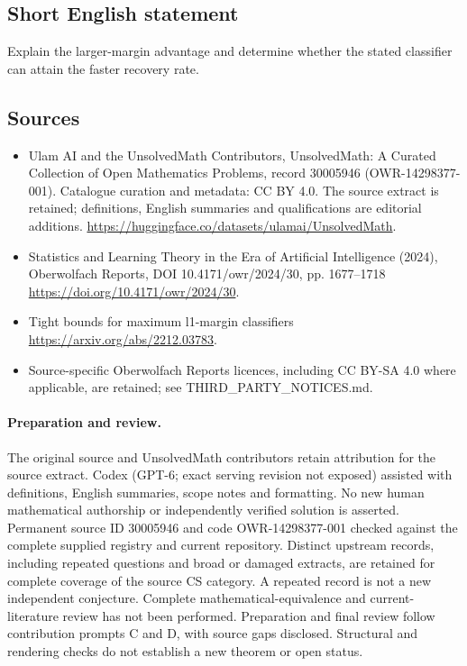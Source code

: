 \documentclass[11pt]{article}
\begin{document}
\subsection{Short English statement}
Explain the larger-margin advantage and determine whether the stated classifier can attain the faster recovery rate.
\subsection{Sources}
\begin{itemize}
\item[\hypertarget{source:30005946:1}{S1}] Ulam AI and the UnsolvedMath Contributors, UnsolvedMath: A Curated Collection of Open Mathematics Problems, record 30005946 (OWR-14298377-001). Catalogue curation and metadata: CC BY 4.0. The source extract is retained; definitions, English summaries and qualifications are editorial additions.
\url{https://huggingface.co/datasets/ulamai/UnsolvedMath}.
\item[\hypertarget{source:30005946:2}{S2}] Statistics and Learning Theory in the Era of Artificial Intelligence (2024), Oberwolfach Reports, DOI 10.4171/owr/2024/30, pp. 1677--1718
\url{https://doi.org/10.4171/owr/2024/30}.
\item[\hypertarget{source:30005946:3}{S3}] Tight bounds for maximum l1-margin classifiers
\url{https://arxiv.org/abs/2212.03783}.
\item Source-specific Oberwolfach Reports licences, including CC BY-SA 4.0 where applicable, are retained; see THIRD\_PARTY\_NOTICES.md.
\end{itemize}
\paragraph{Preparation and review.}
The original source and UnsolvedMath contributors retain attribution for the source extract. Codex (GPT-6; exact serving revision not exposed) assisted with definitions, English summaries, scope notes and formatting. No new human mathematical authorship or independently verified solution is asserted. Permanent source ID 30005946 and code OWR-14298377-001 checked against the complete supplied registry and current repository. Distinct upstream records, including repeated questions and broad or damaged extracts, are retained for complete coverage of the source CS category. A repeated record is not a new independent conjecture. Complete mathematical-equivalence and current-literature review has not been performed. Preparation and final review follow contribution prompts C and D, with source gaps disclosed. Structural and rendering checks do not establish a new theorem or open status.
\label{end:30005946}
\end{document}

